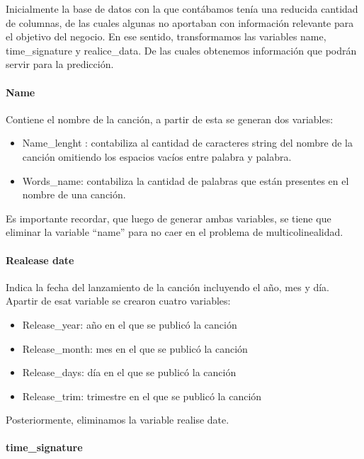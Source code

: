 \documentclass[
  letterpaper,
  DIV=11,
  numbers=noendperiod]{scrartcl}
\providecommand{\tightlist}{%
  \setlength{\itemsep}{0pt}\setlength{\parskip}{0pt}}
\let\oldparagraph\paragraph
\renewcommand{\paragraph}[1]{\oldparagraph{#1}\mbox{}}
\begin{document}
Inicialmente la base de datos con la que contábamos tenía una reducida
cantidad de columnas, de las cuales algunas no aportaban con información
relevante para el objetivo del negocio. En ese sentido, transformamos
las variables name, time\_signature y realice\_data. De las cuales
obtenemos información que podrán servir para la predicción.

\hypertarget{name}{%
\paragraph{Name}\label{name}}

Contiene el nombre de la canción, a partir de esta se generan dos
variables:

\begin{itemize}
\tightlist
\item
  Name\_lenght : contabiliza al cantidad de caracteres string del nombre
  de la canción omitiendo los espacios vacíos entre palabra y palabra.
\item
  Words\_name: contabiliza la cantidad de palabras que están presentes
  en el nombre de una canción.
\end{itemize}

Es importante recordar, que luego de generar ambas variables, se tiene
que eliminar la variable ``name'' para no caer en el problema de
multicolinealidad.

\hypertarget{realease-date}{%
\paragraph{Realease date}\label{realease-date}}

Indica la fecha del lanzamiento de la canción incluyendo el año, mes y
día. Apartir de esat variable se crearon cuatro variables:

\begin{itemize}
\tightlist
\item
  Release\_year: año en el que se publicó la canción
\item
  Release\_month: mes en el que se publicó la canción
\item
  Release\_days: día en el que se publicó la canción
\item
  Release\_trim: trimestre en el que se publicó la canción
\end{itemize}

Posteriormente, eliminamos la variable realise date.

\hypertarget{time_signature}{%
\paragraph{time\_signature}\label{time_signature}}
\end{document}
